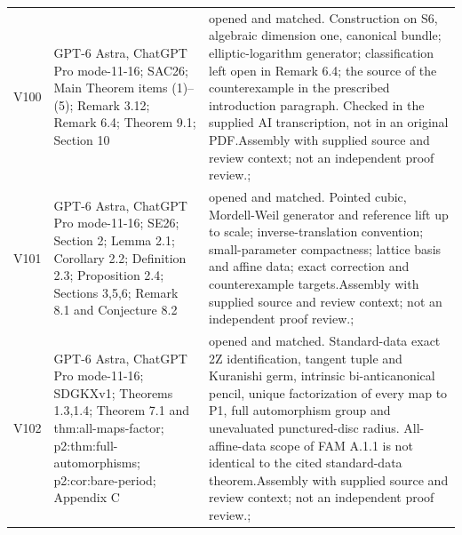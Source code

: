 \begin{longtable}{@{}L{.08\linewidth}L{.31\linewidth}L{.56\linewidth}@{}}
V100 & GPT-6 Astra, ChatGPT Pro mode-11-16; S\newline AC26; Main Theorem items (1)--(5); Remark 3.12; Remark 6.4; Theorem 9.1; Section 10 & opened and matched. Construction on S6, algebraic dimension one, canonical bundle; elliptic-logarithm generator; classification left open in Remark 6.4; the source of the counterexample in the prescribed introduction paragraph. Checked in the supplied AI transcription, not in an original PDF.\newline Assembly with supplied source and review context; not an independent proof review.\newline {}; \\
V101 & GPT-6 Astra, ChatGPT Pro mode-11-16; S\newline E26; Section 2; Lemma 2.1; Corollary 2.2; Definition 2.3; Proposition 2.4; Sections 3,5,6; Remark 8.1 and Conjecture 8.2 & opened and matched. Pointed cubic, Mordell-Weil generator and reference lift up to scale; inverse-translation convention; small-parameter compactness; lattice basis and affine data; exact correction and counterexample targets.\newline Assembly with supplied source and review context; not an independent proof review.\newline {}; \\
V102 & GPT-6 Astra, ChatGPT Pro mode-11-16; S\newline DGKXv1; Theorems 1.3,1.4; Theorem 7.1 and thm:\allowbreak{}all-maps-factor; p2:\allowbreak{}thm:\allowbreak{}full-automorphisms; p2:\allowbreak{}cor:\allowbreak{}bare-period; Appendix C & opened and matched. Standard-data exact 2Z identification, tangent tuple and Kuranishi germ, intrinsic bi-anticanonical pencil, unique factorization of every map to P1, full automorphism group and unevaluated punctured-disc radius. All-affine-data scope of FAM A.1.1 is not identical to the cited standard-data theorem.\newline Assembly with supplied source and review context; not an independent proof review.\newline {}; \\

\end{longtable}
